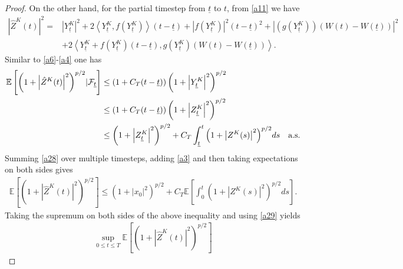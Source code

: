 \documentclass[preprint,12pt,compress]{elsarticle}
\begin{document}
\begin{proof}
On the other hand, for the partial timestep from $\underline{t}$ to $t$, from \eqref{a11} we have
\begin{equation*}
\begin{split}
	{\left| {{\hat{Z}^K}(t)} \right|^2} =& {\left| {Y_{\underline{t}}^K} \right|^2} + 2\left\langle {Y_{\underline{t}}^K,f(Y_{\underline{t}}^K)} \right\rangle (t - \underline{t}) + {\left| {f(Y_{\underline{t}}^K)} \right|^2}{(t - \underline{t})^2} + {\left| {{{\left( {g(Y_{\underline{t}}^K)} \right)}}\left( {W(t) - W(\underline{t})} \right)} \right|^2} \\
	&+ 2\left\langle {Y_{\underline{t}}^K + f(Y_{\underline{t}}^K)(t - \underline{t}),g(Y_{\underline{t}}^K)(W(t) - W(\underline{t}))} \right\rangle .
\end{split}
\end{equation*}
Similar to \eqref{a6}-\eqref{a4} one has
\begin{equation}  \label{a3}
\begin{split}
	\mathbb{E}\left[ {{{\left( {1 + {{\left| {{\hat Z^K}(t)} \right|}^2}} \right)}^{p/2}}|{{\cal F}_{\underline{t}}}} \right] 
	&\le \left( {1 + C_T(t - \underline{t})} \right){\left( {1 + {{\left| {Y_{\underline{t}}^K} \right|}^2}} \right)^{p/2}} \\
	 &\le \left( {1 + C_T(t - \underline{t})} \right){\left( {1 + {{\left| {Z_{\underline{t}}^K} \right|}^2}} \right)^{p/2}} \\
	&\le {\left( {1 + {{\left| {Z_{\underline{t}}^K} \right|}^2}} \right)^{p/2}} + C_T\int_{\underline{t}}^t {{{\left( {1 + {{\left| {{{Z}^K}(s)} \right|}^2}} \right)}^{p/2}}ds}  \quad \text{a.s.}
\end{split}
\end{equation}
Summing \eqref{a28} over multiple timesteps, adding \eqref{a3} and then taking expectations on both sides gives
\begin{equation*}
\begin{split}
	\mathbb{E}\left[ {{{\left( {1 + {{\left| {{\hat Z^K}(t)} \right|}^2}} \right)}^{p/2}}} \right] \le {\left( {1 + {{\left| {{x_0}} \right|}^2}} \right)^{p/2}} + C_T\mathbb{E}\left[ {\int_0^t {{{\left( {1 + {{\left| {{{Z}^K}(s)} \right|}^2}} \right)}^{p/2}}ds} } \right].
\end{split}
\end{equation*}
Taking the supremum on both sides of the above inequality and using \eqref{a29} yields
\begin{equation*}  \label{a9}
\begin{split}
	\mathop {\sup }\limits_{0 \le t \le T} \mathbb{E}\left[ {{{\left( {1 + {{\left| {{\hat Z^K}(t)} \right|}^2}} \right)}^{p/2}}} \right] 

\end{split}
\end{equation*}
\end{proof}
\end{document}
